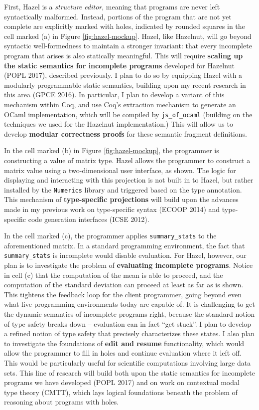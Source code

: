 \documentclass[10pt]{article}
\let\li\lstinline
\begin{document}
First, Hazel is a \emph{structure editor}, meaning that programs are never left syntactically malformed. Instead, portions of the program that are not yet complete are explicitly marked with holes, indicated by rounded squares in the cell marked (a) in Figure \ref{fig:hazel-mockup}. Hazel, like Hazelnut, will go beyond syntactic well-formedness to maintain a stronger invariant: that every incomplete program that arises is also statically meaningful. This will require \textbf{scaling up the static semantics for incomplete programs} developed for Hazelnut (POPL 2017), described previously. I plan to do so by equipping Hazel with a modularly programmable static semantics, building upon my recent research in this area (GPCE 2016). In particular, I plan to develop a variant of this mechanism within Coq, and use Coq's extraction mechanism to generate an OCaml implementation, which will be compiled by \li{js_of_ocaml} (building on the techniques we used for the Hazelnut implementation.) This will allow us to develop \textbf{modular correctness proofs} for these semantic fragment definitions.

In the cell marked (b) in Figure \ref{fig:hazel-mockup}, the programmer is constructing a value of matrix type. Hazel allows the programmer to construct a matrix value using a {two-dimensional user interface}, as shown. The logic for displaying and interacting with this projection is not built in to Hazel, but rather installed by the \li{Numerics} library and triggered based on the type annotation. This mechanism of \textbf{type-specific projections} will build upon the advances made in my previous work on type-specific syntax (ECOOP 2014) and type-specific code generation interfaces (ICSE 2012).

In the cell marked (c), the programmer applies \li{summary_stats} to the aforementioned matrix. In a standard programming environment, the fact that \li{summary_stats} is incomplete would disable evaluation. For Hazel, however, our plan is to investigate the problem of \textbf{evaluating incomplete programs}. Notice in cell (c) that the computation of the mean is able to proceed, and the computation of the standard deviation can proceed at least as far as is shown. This tightens the feedback loop for the client programmer, going beyond even what live programming environments today are capable of. It is challenging to get the dynamic semantics of incomplete programs right, because the standard notion of type safety breaks down -- evaluation can in fact ``get stuck''. I plan to develop a refined notion of type safety that precisely characterizes these states. I also plan to investigate the foundations of \textbf{edit and resume} functionality, which would allow the programmer to fill in holes and continue evaluation where it left off. This would be particularly useful for scientific computations involving large data sets. This line of research will build both upon the static semantics for incomplete programs we have developed (POPL 2017) and on work on contextual modal type theory (CMTT), which lays logical foundations beneath the problem of reasoning about programs with holes.
\end{document}
